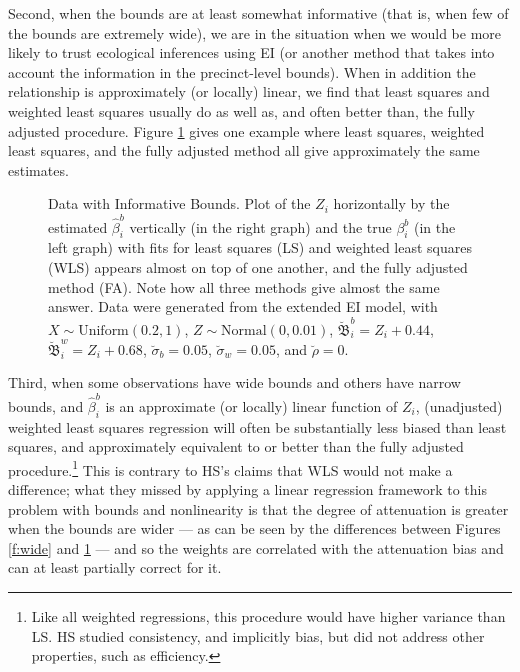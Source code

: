 \documentclass[11pt,titlepage]{article}
\newcommand{\bbeta}{{\mathfrak B}}
\newcommand{\sigmau}{\breve{\sigma}}
\newcommand{\rhou}{\breve{\rho}}
\begin{document}
Second, when the bounds are at least somewhat informative (that is,
when few of the bounds are extremely wide), we are in the situation
when we would be more likely to trust ecological inferences using EI
(or another method that takes into account the information in the
precinct-level bounds).  When in addition the relationship is
approximately (or locally) linear, we find that least squares and
weighted least squares usually do as well as, and often better than,
the fully adjusted procedure.  Figure \ref{f:narrow} gives one example
where least squares, weighted least squares, and the fully adjusted
method all give approximately the same estimates.
\begin{figure}[t]
  \begin{center}
    \caption{Data with Informative Bounds. Plot of the $Z_i$ horizontally by
      the estimated $\hat\beta_i^b$ vertically (in the right graph)
      and the true $\beta_i^b$ (in the left graph) with fits for least
      squares (LS) and weighted least squares (WLS) appears almost on
      top of one another, and the fully adjusted method (FA).  Note
      how all three methods give almost the same answer. Data were
      generated from the extended EI model, with $X \sim
      \textrm{Uniform}(0.2,1)$, $Z \sim \textrm{Normal}(0,0.01)$,
      $\breve\bbeta_i^b = Z_i + 0.44$, $\breve\bbeta_i^w = Z_i +
      0.68$, $\sigmau_b = 0.05$, $\sigmau_w = 0.05$, and $\rhou = 0$.}
    \label{f:narrow}
  \end{center}
\end{figure}

Third, when some observations have wide bounds and others have narrow
bounds, and $\hat\beta_i^b$ is an approximate (or locally) linear
function of $Z_i$, (unadjusted) weighted least squares regression will
often be substantially less biased than least squares, and
approximately equivalent to or better than the fully adjusted
procedure.\footnote{Like all weighted regressions, this procedure
  would have higher variance than LS. HS studied consistency, and
  implicitly bias, but did not address other properties, such as
  efficiency.}  This is contrary to
HS's claims that WLS would not make a difference; what they missed by
applying a linear regression framework to this problem with bounds and
nonlinearity is that the degree of attenuation is greater when the
bounds are wider --- as can be seen by the differences between Figures
\ref{f:wide} and \ref{f:narrow} --- and so the weights are correlated
with the attenuation bias and can at least partially correct for it.
\end{document}
